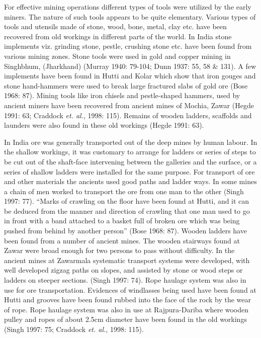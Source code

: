 \vspace{.2cm}


For effective mining operations different types of tools were utilized by the early miners. The nature of such tools appears to be quite elementary.  Various types of tools and utensils made of stone, wood, bone, metal, clay etc. have been recovered from old workings in different parts of the world. In India stone implements viz. grinding stone, pestle, crushing stone etc. have been found from various mining zones. Stone tools were used in gold and copper mining in Singhbhum, (Jharkhand) (Murray 1940: 79-104; Dunn 1937: 55, 58 \& 131). A few implements have been found in Hutti and Kolar which show that iron gouges and stone hand-hammers were used to break large fractured slabs of gold ore (Bose 1968: 87). Mining tools like iron chisels and pestle-shaped hammers, used by ancient miners have been recovered from ancient mines of Mochia, Zawar (Hegde 1991: 63; Craddock {\it et. al.}, 1998: 115). Remains of wooden ladders, scaffolds and launders were also found in these old workings (Hegde 1991: 63).  


\vspace{.2cm}


In India ore was generally transported out of the deep mines by human labour. In the shallow workings, it was customary to arrange for ladders or series of steps to be cut out of the shaft-face intervening between the galleries and the surface, or a series of shallow ladders were installed for the same purpose. For transport of ore and other materials the ancients used good paths and ladder ways. In some mines a chain of men worked to transport the ore from one man to the other (Singh 1997: 77). “Marks of crawling on the floor have been found at Hutti, and it can be deduced from the manner and direction of crawling that one man used to go in front with a band attached to a basket full of broken ore which was being pushed from behind by another person” (Bose 1968: 87). Wooden ladders have been found from a number of ancient mines. The wooden stairways found at Zawar were broad enough for two persons to pass without difficulty. In the ancient mines at Zawarmala systematic transport systems were developed, with well developed zigzag paths on slopes, and assisted by stone or wood steps or ladders on steeper sections. (Singh 1997: 74). Rope haulage system was also in use for ore transportation. Evidences of windlasses being used have been found at Hutti and grooves have been found rubbed into the face of the rock by the wear of rope. Rope haulage system was also in use at Rajpura-Dariba where wooden pulley and ropes of about 2.5cm diameter have been found in the old workings (Singh 1997: 75; Craddock {\it et. al.}, 1998: 115).

